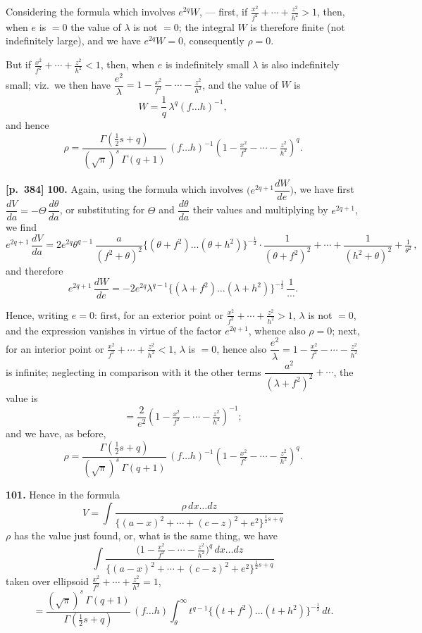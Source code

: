 \documentclass[11pt,a4paper]{article}
\begin{document}
Considering the formula which involves $e^{2q}W$, --- first, if $\tfrac{x^{2}}{f^{2}} + \cdots + \tfrac{z^{2}}{h^{2}} > 1$, then, when $e$ is $= 0$ the value of $\lambda$ is not $= 0$; the integral $W$ is therefore finite (not indefinitely large), and we have $e^{2q}W = 0$, consequently $\rho = 0$.

But if $\tfrac{x^{2}}{f^{2}} + \cdots + \tfrac{z^{2}}{h^{2}} < 1$, then, when $e$ is indefinitely small $\lambda$ is also indefinitely small; viz.\ we then have $\dfrac{e^{2}}{\lambda} = 1 - \tfrac{x^{2}}{f^{2}} - \cdots - \tfrac{z^{2}}{h^{2}}$, and the value of $W$ is
\[
W = \frac{1}{q}\,\lambda^{q}(f\ldots h)^{-1},
\]
and hence
\[
\rho = \frac{\Gamma(\tfrac{1}{2}s + q)}{(\sqrt{\pi})^{s}\,\Gamma(q+1)}\,(f\ldots h)^{-1}\left(1 - \tfrac{x^{2}}{f^{2}} - \cdots - \tfrac{z^{2}}{h^{2}}\right)^{q}.
\]

\noindent\textbf{[p.~384]}\quad
\textbf{100.} Again, using the formula which involves $\bigl(e^{2q+1}\dfrac{dW}{de}\bigr)$, we have first $\dfrac{dV}{da} = -\Theta\,\dfrac{d\theta}{da}$, or substituting for $\Theta$ and $\dfrac{d\theta}{da}$ their values and multiplying by $e^{2q+1}$, we find
\[
e^{2q+1}\,\frac{dV}{da} = 2 e^{2q}\theta^{q-1}\,\frac{a}{(f^{2}+\theta)^{2}}\bigl\{(\theta + f^{2})\ldots(\theta + h^{2})\bigr\}^{-\tfrac{1}{2}}\cdot \frac{1}{(\theta + f^{2})^{2}} + \cdots + \frac{1}{(h^{2}+\theta)^{2}} + \tfrac{1}{\theta^{2}}\,,
\]
and therefore
\[
e^{2q+1}\,\frac{dW}{de} = -2 e^{2q}\lambda^{q-1}\bigl\{(\lambda+f^{2})\ldots(\lambda + h^{2})\bigr\}^{-\tfrac{1}{2}}\,\frac{1}{\cdots}.
\]

Hence, writing $e = 0$: first, for an exterior point or $\tfrac{x^{2}}{f^{2}} + \cdots + \tfrac{z^{2}}{h^{2}} > 1$, $\lambda$ is not $= 0$, and the expression vanishes in virtue of the factor $e^{2q+1}$, whence also $\rho = 0$; next, for an interior point or $\tfrac{x^{2}}{f^{2}} + \cdots + \tfrac{z^{2}}{h^{2}} < 1$, $\lambda$ is $= 0$, hence also $\dfrac{e^{2}}{\lambda} = 1 - \tfrac{x^{2}}{f^{2}} - \cdots - \tfrac{z^{2}}{h^{2}}$ is infinite; neglecting in comparison with it the other terms $\dfrac{a^{2}}{(\lambda + f^{2})^{2}} + \cdots$, the value is
\[
= \frac{2}{e^{2}}\left( 1 - \tfrac{x^{2}}{f^{2}} - \cdots - \tfrac{z^{2}}{h^{2}} \right)^{-1};
\]
and we have, as before,
\[
\rho = \frac{\Gamma(\tfrac{1}{2}s + q)}{(\sqrt{\pi})^{s}\,\Gamma(q+1)}\,(f\ldots h)^{-1}\left( 1 - \tfrac{x^{2}}{f^{2}} - \cdots - \tfrac{z^{2}}{h^{2}} \right)^{q}.
\]

\textbf{101.} Hence in the formula
\[
V = \int \frac{\rho\,dx\ldots dz}{\bigl\{(a-x)^{2} + \cdots + (c-z)^{2} + e^{2}\bigr\}^{\tfrac{1}{2}s + q}}
\]
$\rho$ has the value just found, or, what is the same thing, we have
\[
\int \frac{\bigl(1 - \tfrac{x^{2}}{f^{2}} - \cdots - \tfrac{z^{2}}{h^{2}}\bigr)^{q}\,dx\ldots dz}{\bigl\{(a-x)^{2} + \cdots + (c-z)^{2} + e^{2}\bigr\}^{\tfrac{1}{2}s + q}}
\]
taken over ellipsoid $\tfrac{x^{2}}{f^{2}} + \cdots + \tfrac{z^{2}}{h^{2}} = 1$,
\[
= \frac{(\sqrt{\pi})^{s}\,\Gamma(q+1)}{\Gamma(\tfrac{1}{2}s + q)}\,(f\ldots h)\int_{\theta}^{\infty} t^{q-1}\bigl\{(t+f^{2})\ldots(t+h^{2})\bigr\}^{-\tfrac{1}{2}}\,dt.
\]
\end{document}
